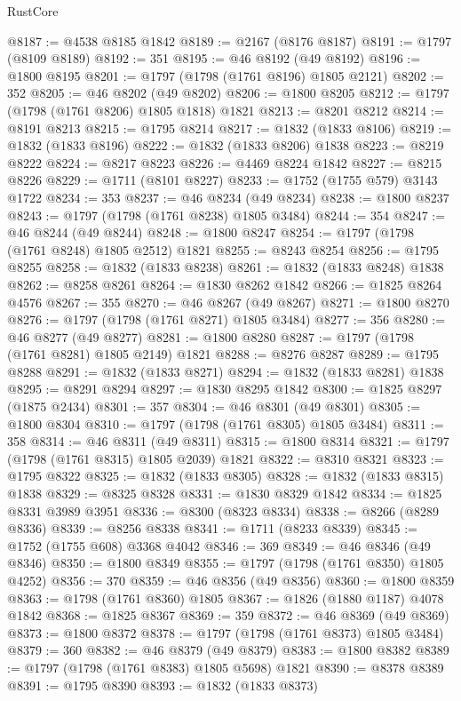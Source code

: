 \begin{lexlean}{RustCore}
\begin{coremodule}
@8187 := @4538 @8185 @1842
@8189 := @2167 (@8176 @8187)
@8191 := @1797 (@8109 @8189)
@8192 := 351
@8195 := @46 @8192 (@49 @8192)
@8196 := @1800 @8195
@8201 := @1797 (@1798 (@1761 @8196) @1805 @2121)
@8202 := 352
@8205 := @46 @8202 (@49 @8202)
@8206 := @1800 @8205
@8212 := @1797 (@1798 (@1761 @8206) @1805 @1818) @1821
@8213 := @8201 @8212
@8214 := @8191 @8213
@8215 := @1795 @8214
@8217 := @1832 (@1833 @8106)
@8219 := @1832 (@1833 @8196)
@8222 := @1832 (@1833 @8206) @1838
@8223 := @8219 @8222
@8224 := @8217 @8223
@8226 := @4469 @8224 @1842
@8227 := @8215 @8226
@8229 := @1711 (@8101 @8227)
@8233 := @1752 (@1755 @579) @3143 @1722
@8234 := 353
@8237 := @46 @8234 (@49 @8234)
@8238 := @1800 @8237
@8243 := @1797 (@1798 (@1761 @8238) @1805 @3484)
@8244 := 354
@8247 := @46 @8244 (@49 @8244)
@8248 := @1800 @8247
@8254 := @1797 (@1798 (@1761 @8248) @1805 @2512) @1821
@8255 := @8243 @8254
@8256 := @1795 @8255
@8258 := @1832 (@1833 @8238)
@8261 := @1832 (@1833 @8248) @1838
@8262 := @8258 @8261
@8264 := @1830 @8262 @1842
@8266 := @1825 @8264 @4576
@8267 := 355
@8270 := @46 @8267 (@49 @8267)
@8271 := @1800 @8270
@8276 := @1797 (@1798 (@1761 @8271) @1805 @3484)
@8277 := 356
@8280 := @46 @8277 (@49 @8277)
@8281 := @1800 @8280
@8287 := @1797 (@1798 (@1761 @8281) @1805 @2149) @1821
@8288 := @8276 @8287
@8289 := @1795 @8288
@8291 := @1832 (@1833 @8271)
@8294 := @1832 (@1833 @8281) @1838
@8295 := @8291 @8294
@8297 := @1830 @8295 @1842
@8300 := @1825 @8297 (@1875 @2434)
@8301 := 357
@8304 := @46 @8301 (@49 @8301)
@8305 := @1800 @8304
@8310 := @1797 (@1798 (@1761 @8305) @1805 @3484)
@8311 := 358
@8314 := @46 @8311 (@49 @8311)
@8315 := @1800 @8314
@8321 := @1797 (@1798 (@1761 @8315) @1805 @2039) @1821
@8322 := @8310 @8321
@8323 := @1795 @8322
@8325 := @1832 (@1833 @8305)
@8328 := @1832 (@1833 @8315) @1838
@8329 := @8325 @8328
@8331 := @1830 @8329 @1842
@8334 := @1825 @8331 @3989 @3951
@8336 := @8300 (@8323 @8334)
@8338 := @8266 (@8289 @8336)
@8339 := @8256 @8338
@8341 := @1711 (@8233 @8339)
@8345 := @1752 (@1755 @608) @3368 @4042
@8346 := 369
@8349 := @46 @8346 (@49 @8346)
@8350 := @1800 @8349
@8355 := @1797 (@1798 (@1761 @8350) @1805 @4252)
@8356 := 370
@8359 := @46 @8356 (@49 @8356)
@8360 := @1800 @8359
@8363 := @1798 (@1761 @8360) @1805
@8367 := @1826 (@1880 @1187) @4078 @1842
@8368 := @1825 @8367
@8369 := 359
@8372 := @46 @8369 (@49 @8369)
@8373 := @1800 @8372
@8378 := @1797 (@1798 (@1761 @8373) @1805 @3484)
@8379 := 360
@8382 := @46 @8379 (@49 @8379)
@8383 := @1800 @8382
@8389 := @1797 (@1798 (@1761 @8383) @1805 @5698) @1821
@8390 := @8378 @8389
@8391 := @1795 @8390
@8393 := @1832 (@1833 @8373)

\end{coremodule}
\end{lexlean}
